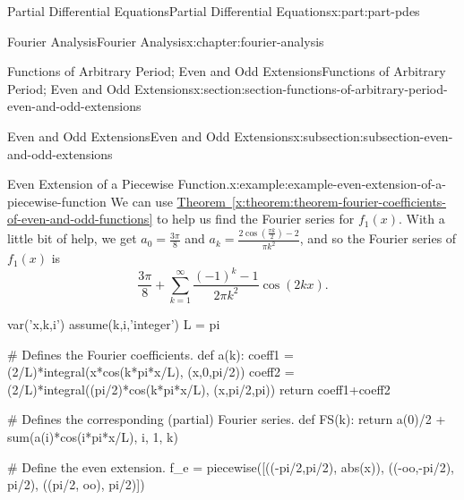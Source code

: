 \documentclass[oneside,10pt,]{book}
\newcommand{\xreffont}{\relax}
\numberwithin{equation}{part}
\begin{document}
\begin{partptx}{Partial Differential Equations}{}{Partial Differential Equations}{}{}{x:part:part-pdes}
\begin{chapterptx}{Fourier Analysis}{}{Fourier Analysis}{}{}{x:chapter:fourier-analysis}
\begin{sectionptx}{Functions of Arbitrary Period; Even and Odd Extensions}{}{Functions of Arbitrary Period; Even and Odd Extensions}{}{}{x:section:section-functions-of-arbitrary-period-even-and-odd-extensions}
\begin{subsectionptx}{Even and Odd Extensions}{}{Even and Odd Extensions}{}{}{x:subsection:subsection-even-and-odd-extensions}
\begin{example}{Even Extension of a Piecewise Function.}{x:example:example-even-extension-of-a-piecewise-function}
We can use \hyperref[x:theorem:theorem-fourier-coefficients-of-even-and-odd-functions]{Theorem~{\xreffont\ref{x:theorem:theorem-fourier-coefficients-of-even-and-odd-functions}}} to help us find the Fourier series for \(f_{1}(x)\). With a little bit of help, we get \(a_{0} = \frac{3\pi}{8}\) and \(a_{k} = \frac{2\cos(\frac{\pi k}{2})-2}{\pi k^{2}}\), and so the Fourier series of \(f_{1}(x)\) is%
\begin{equation*}
\frac{3\pi}{8}+\sum_{k=1}^{\infty}\frac{(-1)^{k}-1}{2\pi k^{2}}\cos(2kx).
\end{equation*}
%
\end{example}
\begin{sageinput}
var('x,k,i')
assume(k,i,'integer')
L = pi

# Defines the Fourier coefficients.
def a(k):
  coeff1 = (2/L)*integral(x*cos(k*pi*x/L), (x,0,pi/2))
  coeff2 = (2/L)*integral((pi/2)*cos(k*pi*x/L), (x,pi/2,pi))
  return coeff1+coeff2

# Defines the corresponding (partial) Fourier series.
def FS(k):
  return a(0)/2 + sum(a(i)*cos(i*pi*x/L), i, 1, k)

# Define the even extension.
f_e = piecewise([((-pi/2,pi/2), abs(x)), ((-oo,-pi/2), pi/2), ((pi/2, oo), pi/2)])


\end{sageinput}
\end{subsectionptx}
\end{sectionptx}
\end{chapterptx}
\end{partptx}
\end{document}
